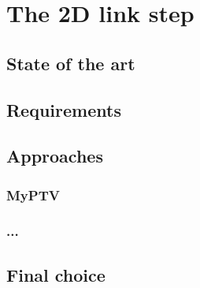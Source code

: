 \chapter{The 2D link step}
\label{chap:2dlink}

\section{State of the art}
\section{Requirements}
\section{Approaches}
\subsection{MyPTV}
\subsection{...}
\section{Final choice}
